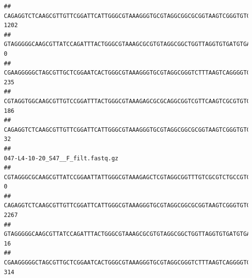 \documentclass[]{article}
\begin{document}
\begin{verbatim}
## CAGAGGTCTCAAGCGTTGTTCGGATTCATTGGGCGTAAAGGGTGCGTAGGCGGCGCGGTAAGTCGGGTGTGAAATCTCGGAGCTTAACTCCGAAACTGCATTCGATACTGCCGTGCTTGAGGACTGGAGAGGAGACTGGAATTTACGGTGTAGCGGTGAAATGCGTAGATATCGTAAGGAAGACCAGTGGCGAAGGCGGGTCTCTGGACAGTTCCTGACGCTGAGGCACGAAGGCCAGGGGAGCAAACG                             1202
## GTAGGGGGCAAGCGTTATCCAGATTTACTGGGCGTAAAGCGCGTGTAGGCGGCTGGTTAGGTGTGATGTGAAATCTTCCGGCTCAACCGGAAAACTGCATTGCAAACCGGCCTGGCTAGAGTGCAGGAGAGGGAAGCGGAATTCCAGGTGTAGCGGTGAAATGCGTAGATATCTGGAGGAACACCAGTGGCGAAGGCGGCTTCCTGGCCTGCAACTGACGCTGAGACGCGAAAGCGTGGGGAGCGAAC                                 0
## CGAAGGGGGCTAGCGTTGCTCGGAATCACTGGGCGTAAAGGGTGCGTAGGCGGGTCTTTAAGTCAGGGGTGAAATCCTGGAGCTCAACTCCAGAACTGCCTTTGATACTGAAGATCTTGAGTTCGGGAGAGGTGAGTGGAACTGCGAGTGTAGAGGTGAAATTCGTAGATATTCGCAAGAACACCAGTGGCGAAGGCGGCTCACTGGCCCGATACTGACGCTGAGGCACGAAAGCGTGGGGAGCAAACA                              235
## CGTAGGTGGCAAGCGTTGTCCGGATTTACTGGGCGTAAAGAGCGCGCAGGCGGTCGTTCAAGTCGCGTGTGAAAGCCCCCGGCTCAACTGGGGAGGGTCACGCGATACTGATCGACTCGAAGGCAGGAGAGGGTAGTGGAATTCCCGGTGTAGTGGTGAAATGCGTAGATATCGGGAGGAACACCAGTGGCGAAGGCGACTACCTGGCCTGTTCTTGACGCTGAGGCGCGAAAGCTAGGGGAGCAAACG                              186
## CAGAGGTCTCAAGCGTTGTTCGGATTCATTGGGCGTAAAGGGTGCGTAGGCGGCGCGGTAAGTCGGGTGTGAAATCTCGGGGCTTAACTCCGAAACTGCATTCGATACTGCCGTGCTTGAGGACTGGAGAGGAGACTGGAATTTACGGTGTAGCGGTGAAATGCGTAGATATCGTAAGGAAGACCAGTGGCGAAGGCGGGTCTCTGGACAGTTCCTGACGCTGAGGCACGAAGGCCAGGGGAGCAAACG                               32
##                                                                                                                                                                                                                                                           047-L4-10-20_S47__F_filt.fastq.gz
## CGTAGGGCGCAAGCGTTATCCGGAATTATTGGGCGTAAAGAGCTCGTAGGCGGTTTGTCGCGTCTGCCGTGAAAGTCCGGGGCTCAACTCCGGATCTGCGGTGGGTACGGGCAGACTAGAGTGATGTAGGGGAGACTGGAATTCCTGGTGTAGCGGTGAAATGCGCAGATATCAGGAGGAACACCGATGGCGAAGGCAGGTCTCTGGGCATTAACTGACGCTGAGGAGCGAAAGCATGGGGAGCGAACA                                 0
## CAGAGGTCTCAAGCGTTGTTCGGATTCATTGGGCGTAAAGGGTGCGTAGGCGGCGCGGTAAGTCGGGTGTGAAATCTCGGAGCTTAACTCCGAAACTGCATTCGATACTGCCGTGCTTGAGGACTGGAGAGGAGACTGGAATTTACGGTGTAGCGGTGAAATGCGTAGATATCGTAAGGAAGACCAGTGGCGAAGGCGGGTCTCTGGACAGTTCCTGACGCTGAGGCACGAAGGCCAGGGGAGCAAACG                              2267
## GTAGGGGGCAAGCGTTATCCAGATTTACTGGGCGTAAAGCGCGTGTAGGCGGCTGGTTAGGTGTGATGTGAAATCTTCCGGCTCAACCGGAAAACTGCATTGCAAACCGGCCTGGCTAGAGTGCAGGAGAGGGAAGCGGAATTCCAGGTGTAGCGGTGAAATGCGTAGATATCTGGAGGAACACCAGTGGCGAAGGCGGCTTCCTGGCCTGCAACTGACGCTGAGACGCGAAAGCGTGGGGAGCGAAC                                 16
## CGAAGGGGGCTAGCGTTGCTCGGAATCACTGGGCGTAAAGGGTGCGTAGGCGGGTCTTTAAGTCAGGGGTGAAATCCTGGAGCTCAACTCCAGAACTGCCTTTGATACTGAAGATCTTGAGTTCGGGAGAGGTGAGTGGAACTGCGAGTGTAGAGGTGAAATTCGTAGATATTCGCAAGAACACCAGTGGCGAAGGCGGCTCACTGGCCCGATACTGACGCTGAGGCACGAAAGCGTGGGGAGCAAACA                               314

\end{verbatim}
\end{document}
